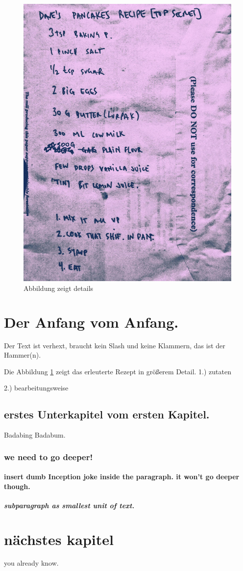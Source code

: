 \documentclass{article}
\begin{document}
    \tableofcontents

    \newpage

    \listoffigures

    \begin{figure}
        \centering
        \includegraphics[width=0.5\linewidth]{graphics/DAVES_PANCAKES_RECIPE.jpg}
        \caption[cooles rezept]{Abbildung zeigt details}

        
        \label{fig:DAVES_PANCAKES_RECIPE}
    \end{figure}
    
    \section{Der Anfang vom Anfang.}
    Der Text ist verhext, braucht kein Slash und keine Klammern, 
    das ist der Hammer(n).
    
        Die Abbildung \ref{fig:DAVES_PANCAKES_RECIPE} zeigt das erleuterte Rezept
        in größerem Detail. 
        1.) zutaten

        2.) bearbeitungsweise
        
        \subsection {erstes Unterkapitel vom ersten Kapitel.}
        Badabing Badabum.

            \subsubsection{we need to go deeper!}

                \paragraph{insert dumb Inception joke inside the paragraph. it won't go deeper though.} 
                   
                    \subparagraph{subparagraph as smallest unit of text.}

    \section{nächstes kapitel}
    you already know. 

    
    
\end{document}
